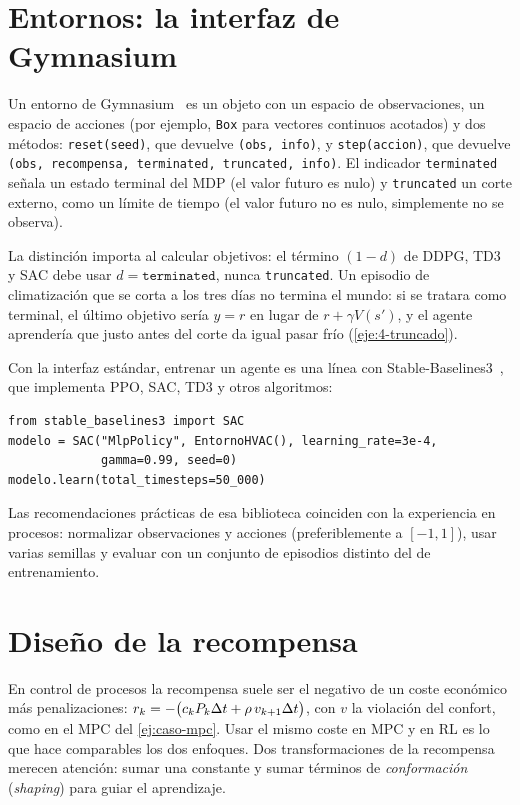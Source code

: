 \section{Entornos: la interfaz de Gymnasium}

\begin{definicion}\label{def:gym}
Un entorno de Gymnasium~\cite{gymnasium} es un objeto con un espacio de observaciones, un espacio de acciones (por ejemplo, \texttt{Box} para vectores continuos acotados) y dos métodos: \texttt{reset(seed)}, que devuelve \texttt{(obs, info)}, y \texttt{step(accion)}, que devuelve \texttt{(obs, recompensa, terminated, truncated, info)}. El indicador \texttt{terminated} señala un estado terminal del MDP (el valor futuro es nulo) y \texttt{truncated} un corte externo, como un límite de tiempo (el valor futuro no es nulo, simplemente no se observa).
\end{definicion}

La distinción importa al calcular objetivos: el término $(1-d)$ de DDPG, TD3 y SAC debe usar $d=\texttt{terminated}$, nunca \texttt{truncated}. Un episodio de climatización que se corta a los tres días no termina el mundo: si se tratara como terminal, el último objetivo sería $y=r$ en lugar de $r+\gamma V(s')$, y el agente aprendería que justo antes del corte da igual pasar frío (\cref{eje:4-truncado}).

Con la interfaz estándar, entrenar un agente es una línea con Stable-Baselines3~\cite{sb3}, que implementa PPO, SAC, TD3 y otros algoritmos:
\begin{verbatim}
from stable_baselines3 import SAC
modelo = SAC("MlpPolicy", EntornoHVAC(), learning_rate=3e-4,
             gamma=0.99, seed=0)
modelo.learn(total_timesteps=50_000)
\end{verbatim}
Las recomendaciones prácticas de esa biblioteca coinciden con la experiencia en procesos: normalizar observaciones y acciones (preferiblemente a $[-1,1]$), usar varias semillas y evaluar con un conjunto de episodios distinto del de entrenamiento.

\section{Diseño de la recompensa}

En control de procesos la recompensa suele ser el negativo de un coste económico más penalizaciones: $r_k=-\bigl(c_kP_k\Delta t+\rho\,v_{k+1}\Delta t\bigr)$, con $v$ la violación del confort, como en el MPC del \cref{ej:caso-mpc}. Usar el mismo coste en MPC y en RL es lo que hace comparables los dos enfoques. Dos transformaciones de la recompensa merecen atención: sumar una constante y sumar términos de \emph{conformación} (\emph{shaping}) para guiar el aprendizaje.


